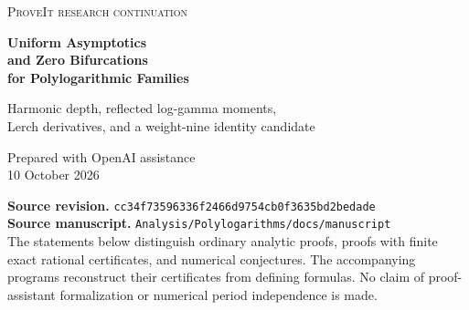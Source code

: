 \documentclass[11pt,letterpaper]{article}
\numberwithin{equation}{section}
\theoremstyle{plain}
\theoremstyle{definition}
\theoremstyle{remark}
\newcommand{\src}[1]{\nolinkurl{#1}}
\begin{document}
\begin{titlepage}
\centering
\vspace*{0.65in}
{\small\scshape\color{accent}ProveIt research continuation\par}
\vspace{0.45in}
{\Huge\bfseries\color{ink}Uniform Asymptotics\\[0.15em]
and Zero Bifurcations\\[0.15em]
for Polylogarithmic Families\par}
\vspace{0.45in}
{\large Harmonic depth, reflected log-gamma moments,\\
Lerch derivatives, and a weight-nine identity candidate\par}
\vspace{0.45in}
{\normalsize Prepared with OpenAI assistance\\
10 October 2026\par}
\vfill
\begin{minipage}{0.9\textwidth}
\small
\textbf{Source revision.}\quad
\src{cc34f73596336f2466d9754cb0f3635bd2bedade}\\
\textbf{Source manuscript.}\quad
\src{Analysis/Polylogarithms/docs/manuscript}\\[0.8em]
The statements below distinguish ordinary analytic proofs, proofs with
finite exact rational certificates, and numerical conjectures. The
accompanying programs reconstruct their certificates from defining formulas.
No claim of proof-assistant formalization or numerical period independence
is made.
\end{minipage}
\vspace*{0.6in}
\end{titlepage}

\begin{abstract}
This continuation addresses parameter ranges and zero phenomena left
unresolved by the consolidated ProveIt polylogarithm manuscript.
For alternating elementary-harmonic sums we prove a saddle expansion
with a relative remainder uniform in the harmonic depth, the shift, and
the ratio of outer exponent to depth. It gives one formula across the
proportional-depth regime and the transition near \(p=h\log h\).
For reflected log-gamma moments we establish a unique saddle for every
positive ratio of the two exponents, with an exact rational certificate
for the sole compact-interval inequality needed in the proof, and derive
both a joint Laplace expansion and a separate critical-window expansion.
For the Stieltjes--Lerch derivative family we determine how an endpoint
multiple zero unfolds: at first derivative order there are only one or
two positive zeros for sufficiently small positive Lerch parameter,
according to the parity of the index. Fresh rational sign certificates
then force an interior multiple-root transition at indices three and
four. Finally, a new weight-nine candidate reduces \(S_8\) to four
single-color Gaussian double polylogarithms and explicit products.
Its very small rigorously enclosed residual is kept separate from a
proof of equality. The article supplies full derivations, a source audit,
reproducible code, and a focused further research programme.
\end{abstract}
\end{document}
